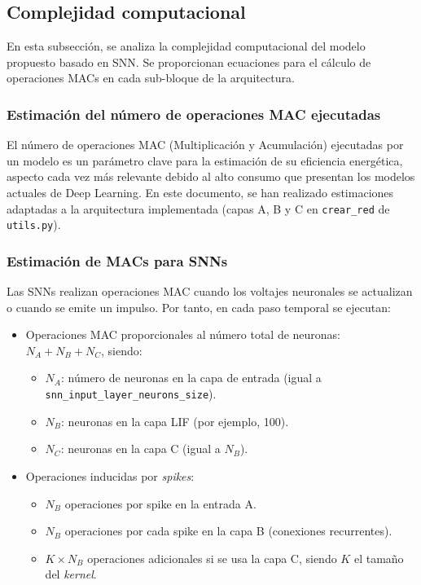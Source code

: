     
\subsection{Complejidad computacional}

En esta subsección, se analiza la complejidad computacional del modelo propuesto basado en SNN. Se proporcionan ecuaciones para el cálculo de operaciones MACs en cada sub-bloque de la arquitectura.

\subsubsection{Estimación del número de operaciones MAC ejecutadas}

El número de operaciones MAC (Multiplicación y Acumulación) ejecutadas por un modelo es un parámetro clave para la estimación de su eficiencia energética, aspecto cada vez más relevante debido al alto consumo que presentan los modelos actuales de Deep Learning. En este documento, se han realizado estimaciones adaptadas a la arquitectura implementada (capas A, B y C en \texttt{crear\_red} de \texttt{utils.py}).

\subsubsection{Estimación de MACs para SNNs}

Las SNNs realizan operaciones MAC cuando los voltajes neuronales se actualizan o cuando se emite un impulso. Por tanto, en cada paso temporal se ejecutan:

\begin{itemize}
    \item Operaciones MAC proporcionales al número total de neuronas: $N_A + N_B + N_C$, siendo:
    \begin{itemize}
        \item $N_A$: número de neuronas en la capa de entrada (igual a \texttt{snn\_input\_layer\_neurons\_size}).
        \item $N_B$: neuronas en la capa LIF (por ejemplo, 100).
        \item $N_C$: neuronas en la capa C (igual a $N_B$).
    \end{itemize}
    
    \item Operaciones inducidas por \textit{spikes}:
    \begin{itemize}
        \item $N_B$ operaciones por spike en la entrada A.
        \item $N_B$ operaciones por cada spike en la capa B (conexiones recurrentes).
        \item $K \times N_B$ operaciones adicionales si se usa la capa C, siendo $K$ el tamaño del \textit{kernel}.
    \end{itemize}
\end{itemize}

